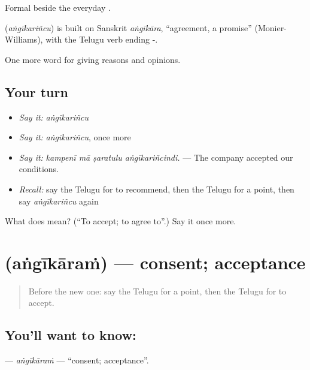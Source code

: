 Formal beside the everyday .

\begin{cousinweb}
\textbf{} (\emph{aṅgīkariñcu}) is built on Sanskrit \emph{aṅgīkāra}, \textquotedblleft{}agreement, a promise\textquotedblright{} (Monier-Williams), with the Telugu verb ending -.
\end{cousinweb}

\begin{grammarlens}[title={What you've built}]
One more word for giving reasons and opinions.
\end{grammarlens}

\subsection*{Your turn}
\begin{itemize}
\raggedright
  \item \emph{Say it:} \emph{aṅgīkariñcu}
  \item \emph{Say it:} \emph{aṅgīkariñcu}, once more
  \item \emph{Say it:} \emph{kampenī mā ṣaratulu aṅgīkariñcindi.} — The company accepted our conditions.
  \item \emph{Recall:} say the Telugu for to recommend, then the Telugu for a point, then say \emph{aṅgīkariñcu} again
\end{itemize}

\begin{tcolorbox}[breakable,colback=teal!4,colframe=teal!35!black,title={Before you move on}]
What does  mean? (\textquotedblleft{}To accept; to agree to\textquotedblright{}.) Say it once more.
\end{tcolorbox}
\section[\texorpdfstring{\te{అంగీకారం} (aṅgīkāraṁ)}{అంగీకారం (aṅgīkāraṁ)}]{ (aṅgīkāraṁ) — consent; acceptance}

\label{lesson:TE-C385-angikaram}



\begin{quote}
Before the new one: say the Telugu for a point, then the Telugu for to accept.
\end{quote}

\subsection*{You'll want to know: }
\textbf{} — \emph{aṅgīkāraṁ} — \textquotedblleft{}consent; acceptance\textquotedblright{}.

